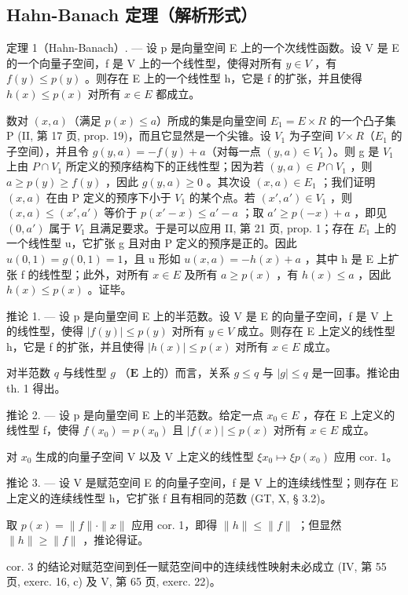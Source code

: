 \subsection{Hahn-Banach 定理（解析形式）}

定理 1（Hahn-Banach）. --- 设 p 是向量空间 E 上的一个次线性函数。设 V 是 E 的一个向量子空间，f 是 V 上的一个线性型，使得对所有 \(y \in V\) ，有 \(f(y) \leqslant p(y)\) 。则存在 E 上的一个线性型 h，它是 f 的扩张，并且使得 \(h(x) \leqslant p(x)\) 对所有 \(x \in E\) 都成立。

数对 \((x, a)\)（满足 \(p(x) \leqslant a\)）所成的集是向量空间 \(E_{1} = E \times R\) 的一个凸子集 P (II, 第 17 页, prop. 19)，而且它显然是一个尖锥。设 \(V_{1}\) 为子空间 \(V \times R\)（\(E_{1}\) 的子空间），并且令 \(g(y, a) = -f(y) + a\)（对每一点 \((y, a) \in V_{1}\) ）。则 g 是 \(V_{1}\) 上由 \(P \cap V_{1}\) 所定义的预序结构下的正线性型；因为若 \((y, a) \in P \cap V_{1}\) ，则 \(a \geqslant p(y) \geqslant f(y)\) ，因此 \(g(y, a) \geqslant 0\) 。其次设 \((x, a) \in E_{1}\) ；我们证明 \((x, a)\) 在由 P 定义的预序下小于 \(V_{1}\) 的某个点。若 \((x', a') \in V_{1}\) ，则 \((x, a) \leqslant (x', a')\) 等价于 \(p(x' - x) \leqslant a' - a\) ；取 \(a' \geqslant p(-x) + a\) ，即见 \((0, a')\) 属于 \(V_{1}\) 且满足要求。于是可以应用 II, 第 21 页, prop. 1；存在 \(E_{1}\) 上的一个线性型 u，它扩张 g 且对由 P 定义的预序是正的。因此 \(u(0, 1) = g(0, 1) = 1\)，且 u 形如 \(u(x, a) = -h(x) + a\) ，其中 h 是 E 上扩张 f 的线性型；此外，对所有 \(x \in E\) 及所有 \(a \geqslant p(x)\) ，有 \(h(x) \leqslant a\) ，因此 \(h(x) \leqslant p(x)\) 。证毕。

推论 1. --- 设 p 是向量空间 E 上的半范数。设 V 是 E 的向量子空间，f 是 V 上的线性型，使得 \(|f(y)| \leqslant p(y)\) 对所有 \(y \in V\) 成立。则存在 E 上定义的线性型 h，它是 f 的扩张，并且使得 \(|h(x)| \leqslant p(x)\) 对所有 \(x \in E\) 成立。

对半范数 \(q\) 与线性型 \(g\) （\(\mathbf{E}\) 上的）而言，关系 \(g \leqslant q\) 与 \(|g| \leqslant q\) 是一回事。推论由 th. 1 得出。

推论 2. --- 设 p 是向量空间 E 上的半范数。给定一点 \(x_{0} \in E\) ，存在 E 上定义的线性型 f，使得 \(f(x_{0}) = p(x_{0})\) 且 \(|f(x)| \leqslant p(x)\) 对所有 \(x \in E\) 成立。

对 \(x_0\) 生成的向量子空间 V 以及 V 上定义的线性型 \(\xi x_0 \mapsto \xi p(x_0)\) 应用 cor. 1。

推论 3. --- 设 V 是赋范空间 E 的向量子空间，f 是 V 上的连续线性型；则存在 E 上定义的连续线性型 h，它扩张 f 且有相同的范数 (GT, X, § 3.2)。

取 \(p(x) = \| f \| \cdot \| x \|\) 应用 cor. 1，即得 \(\| h \| \leqslant \| f \|\) ；但显然 \(\| h \| \geqslant \| f \|\) ，推论得证。

cor. 3 的结论对赋范空间到任一赋范空间中的连续线性映射未必成立 (IV, 第 55 页, exerc. 16, c) 及 V, 第 65 页, exerc. 22)。


